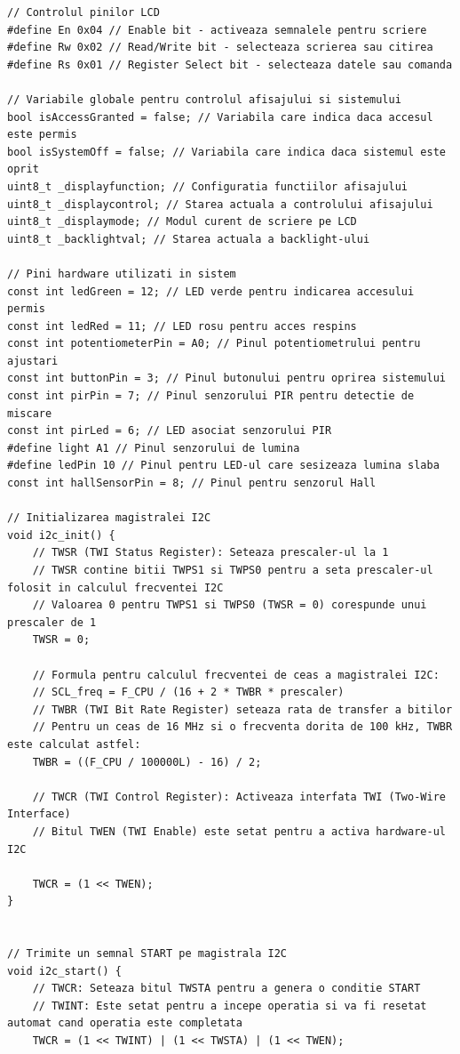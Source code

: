 \documentclass[a4paper,12pt]{report}
\begin{document}
\begin{lstlisting}
// Controlul pinilor LCD
#define En 0x04 // Enable bit - activeaza semnalele pentru scriere
#define Rw 0x02 // Read/Write bit - selecteaza scrierea sau citirea
#define Rs 0x01 // Register Select bit - selecteaza datele sau comanda

// Variabile globale pentru controlul afisajului si sistemului
bool isAccessGranted = false; // Variabila care indica daca accesul este permis
bool isSystemOff = false; // Variabila care indica daca sistemul este oprit
uint8_t _displayfunction; // Configuratia functiilor afisajului
uint8_t _displaycontrol; // Starea actuala a controlului afisajului
uint8_t _displaymode; // Modul curent de scriere pe LCD
uint8_t _backlightval; // Starea actuala a backlight-ului

// Pini hardware utilizati in sistem
const int ledGreen = 12; // LED verde pentru indicarea accesului permis
const int ledRed = 11; // LED rosu pentru acces respins
const int potentiometerPin = A0; // Pinul potentiometrului pentru ajustari
const int buttonPin = 3; // Pinul butonului pentru oprirea sistemului
const int pirPin = 7; // Pinul senzorului PIR pentru detectie de miscare
const int pirLed = 6; // LED asociat senzorului PIR
#define light A1 // Pinul senzorului de lumina
#define ledPin 10 // Pinul pentru LED-ul care sesizeaza lumina slaba
const int hallSensorPin = 8; // Pinul pentru senzorul Hall

// Initializarea magistralei I2C
void i2c_init() {
    // TWSR (TWI Status Register): Seteaza prescaler-ul la 1
    // TWSR contine bitii TWPS1 si TWPS0 pentru a seta prescaler-ul folosit in calculul frecventei I2C
    // Valoarea 0 pentru TWPS1 si TWPS0 (TWSR = 0) corespunde unui prescaler de 1
    TWSR = 0;
    
    // Formula pentru calculul frecventei de ceas a magistralei I2C:
    // SCL_freq = F_CPU / (16 + 2 * TWBR * prescaler)
    // TWBR (TWI Bit Rate Register) seteaza rata de transfer a bitilor
    // Pentru un ceas de 16 MHz si o frecventa dorita de 100 kHz, TWBR este calculat astfel:
    TWBR = ((F_CPU / 100000L) - 16) / 2;

    // TWCR (TWI Control Register): Activeaza interfata TWI (Two-Wire Interface)
    // Bitul TWEN (TWI Enable) este setat pentru a activa hardware-ul I2C
    
    TWCR = (1 << TWEN);
}


// Trimite un semnal START pe magistrala I2C
void i2c_start() {
    // TWCR: Seteaza bitul TWSTA pentru a genera o conditie START
    // TWINT: Este setat pentru a incepe operatia si va fi resetat automat cand operatia este completata
    TWCR = (1 << TWINT) | (1 << TWSTA) | (1 << TWEN);


\end{lstlisting}
\end{document}
